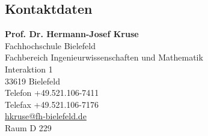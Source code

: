 \documentclass[fontsize=12pt,doubleside,openany,listof=totoc,listof=flat,listof=nochaptergap,numbers=noenddot]{scrbook}
\theoremstyle{style}
\begin{document}
\subsection*{Kontaktdaten}
\noindent\textbf{Prof. Dr. Hermann-Josef Kruse}\\
Fachhochschule Bielefeld\\
Fachbereich Ingenieurwissenschaften und Mathematik\\
Interaktion 1\\
33619 Bielefeld\\
Telefon +49.521.106-7411\\
Telefax +49.521.106-7176\\
\href{mailto:hkruse@fh-bielefeld.de}{hkruse@fh-bielefeld.de}\\
Raum D 229\\
\end{document}
